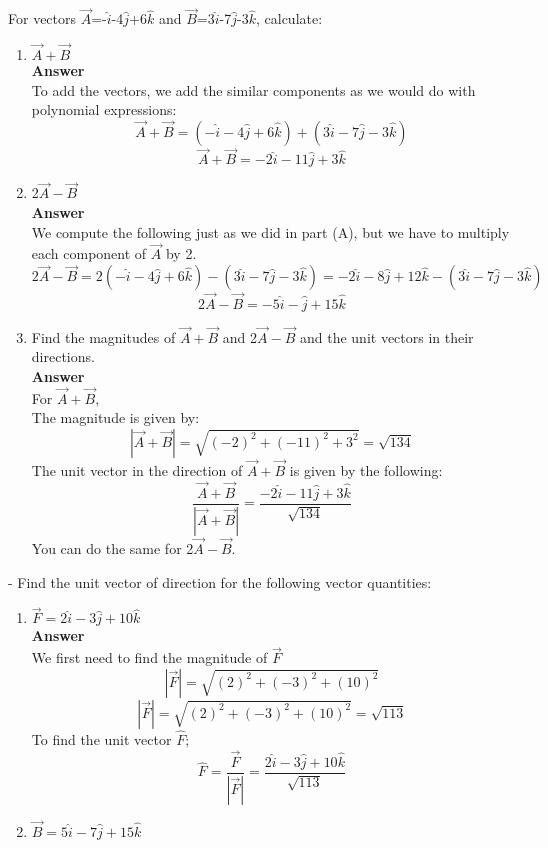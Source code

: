 \documentclass[9pt,addpoints]{exam}
\begin{document}
	\begin{questions}
		\question For vectors  $\vec{A}$=-$\hat{i}$-4$\hat{j}$+6$\hat{k}$ and $\vec{B}$=3$\hat{i}$-7$\hat{j}$-3$\hat{k}$, calculate:
		\begin{enumerate}[label=(\Alph*)]
			\item $\vec{A}+\vec{B}$ \\ \textbf{Answer} \\
			To add the vectors, we add the similar components as we would do with polynomial expressions: \\
			$$\vec{A}+\vec{B}=(-\hat{i}-4\hat{j}+6\hat{k})+(3\hat{i}-7\hat{j}-3\hat{k})$$
			$$\vec{A}+\vec{B}=-2\hat{i}-11\hat{j}+3\hat{k}$$
			\item 2$\vec{A}-\vec{B}$ \\ \textbf{Answer} \\
			We compute the following just as we did in part (A), but we have to multiply each component of $\vec{A}$ by 2. \\
			$$2\vec{A}-\vec{B}=2(-\hat{i}-4\hat{j}+6\hat{k})-(3\hat{i}-7\hat{j}-3\hat{k})=-2\hat{i}-8\hat{j}+12\hat{k}-(3\hat{i}-7\hat{j}-3\hat{k})$$
			$$2\vec{A}-\vec{B}=-5\hat{i}-\hat{j}+15\hat{k}$$
			\item Find the magnitudes of $\vec{A}+\vec{B}$ and 2$\vec{A}-\vec{B}$ and the unit vectors in their directions. \\ \textbf{Answer} \\
			For $\vec{A}+\vec{B}$, \\
			The magnitude is given by:
			$$|\vec{A}+\vec{B}|=\sqrt{(-2)^2+(-11)^2+3^2}=\sqrt{134}$$
			The unit vector in the direction of $\vec{A}+\vec{B}$ is given by the following:
			$$\dfrac{\vec{A}+\vec{B}}{|\vec{A}+\vec{B}|}=\dfrac{-2\hat{i}-11\hat{j}+3\hat{k}}{\sqrt{134}}$$
			You can do the same for 2$\vec{A}-\vec{B}$.
		\end{enumerate}
		-		\question Find the unit vector of direction for the following vector quantities:
		\begin{enumerate}[label=(\Roman*)]
			\item ${\vec{F}}=2\hat{i}-3\hat{j}+10\hat{k}$\\ \textbf{Answer} \\
			We first need to find the magnitude of $\vec{F}$
			$$|\vec{F}|=\sqrt{(2)^2+(-3)^2+(10)^2}$$
			$$|\vec{F}|=\sqrt{(2)^2+(-3)^2+(10)^2}=\sqrt{113}$$
			To find the unit vector $\hat{F}$;
			$$\hat{F}=\dfrac{\vec{F}}{|\vec{F}|}=\dfrac{2\hat{i}-3\hat{j}+10\hat{k}}{\sqrt{113}}$$
			\item ${\vec{B}}=5\hat{i}-7\hat{j}+15\hat{k}$

\end{enumerate}
\end{questions}
\end{document}
